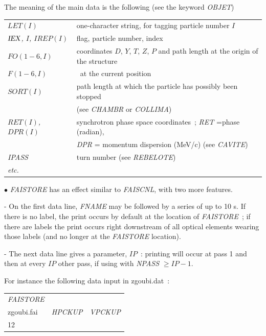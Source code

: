 \noindent The meaning of the main data is the following (see the keyword \textsl{OBJET})
\medskip

{\renewcommand{\arraystretch}{1}
 \begin{tabular}{>{\sl}l!{~:}l}
	$LET(I) $  & one-character string, for tagging particle number $I$  \\   
	$\IEX\index{IEX@{\IEX}}$, $I$, $IREP(I)$   &  flag, particle number, index  \\
	 $FO(1-6, I)$  &  coordinates $D$, $Y$, $T$, $Z$, $P$ and path
	                 length at the origin of the structure\\
	 $F(1-6, I)$  &  \id\, at the current position\\
     $SORT(I)$ & path length at which the particle has possibly been stopped\\
             & (see \textsl{CHAMBR} or \textsl{COLLIMA})\\
     $RET(I)$, $DPR(I)$ & synchrotron phase space coordinates~; \textsl{RET} =phase (radian),\\
           &   \textsl{DPR} = momentum dispersion (MeV/c) (see \textsl{CAVITE}) \\
    \textsl{IPASS}  &  turn number (see \textsl{REBELOTE}) \\
 etc.
     \end{tabular}}
\medskip

\noindent $\bullet$  \textsl{FAISTORE} has an effect similar to \textsl{FAISCNL}, with two more features. 

- On the first data line, \textsl{FNAME} may be followed 
by a series of up to 10 \LABEL s.     If there is no 
label, the print occurs by default at the location of \textsl{FAISTORE}~; if there are labels the 
print occurs right downstream of all optical elements wearing those labels
 (and no longer at the \textsl{FAISTORE} location). 

- The next data line 
gives a parameter, $IP$~: printing will occur at pass 1 and then at every $IP$ other pass, if 
using \REBELOTE{} with \textsl{NPASS} $ \geq IP-1$. 

\medskip

\noindent For instance the following data input in zgoubi.dat~: 

\medskip

{\renewcommand{\arraystretch}{1}
\begin{tabular}{lll}
	\textsl{FAISTORE} &  &   \\
	zgoubi.fai \index{zgoubi.fai} & \textsl{HPCKUP} & \textsl{VPCKUP}  \\
	12 &  & 
\end{tabular}}
\medskip

